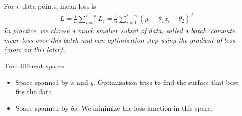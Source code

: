 \begin{frame}%
	For $n$ data points, mean  loss is 
	\begin{align*}
		L = \frac{1}{n} \sum_{i=1}^{i=n}L_i  
		  = \frac{1}{n} \sum_{i=1}^{i=n} (y_i-\theta_1 x_i-\theta_2)^2
	\end{align*}
	{\it In practice, we choose a much smaller subset of data, called a batch, compute 
	mean loss over this batch and run  optimization step using the gradient of loss 
	(more on this later).} 
	\begin{block}{Two different spaces}
		\begin{itemize}
			\item Space spanned by $x$ and $y$. Optimization tries to find the surface that best 
			fits the data. 
			\item Space spanned by $\theta s$. We minimize the loss function in this space.  
		\end{itemize}
	\end{block}
\end{frame}



